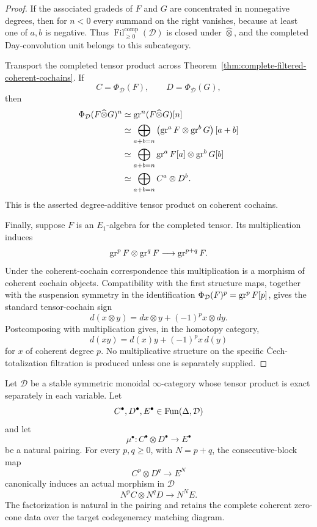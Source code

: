 \begin{proof}
If the associated gradeds of \(F\) and \(G\) are concentrated in
nonnegative degrees, then for \(n<0\) every summand on the right vanishes,
because at least one of \(a,b\) is negative.  Thus
\(\operatorname{Fil}^{\mathrm{comp}}_{\geq0}(\mathcal D)\) is closed under
\(\widehat\otimes\), and the completed Day-convolution unit belongs to this
subcategory.

Transport the completed tensor product across
Theorem~\ref{thm:complete-filtered-coherent-cochains}.  If
\[
    C=\Phi_{\mathcal D}(F),
    \qquad
    D=\Phi_{\mathcal D}(G),
\]
then
\[
\begin{aligned}
    \Phi_{\mathcal D}(F\widehat\otimes G)^n
    &\simeq
    \operatorname{gr}^n(F\widehat\otimes G)[n]
    \\
    &\simeq
    \bigoplus_{a+b=n}
    \left(
        \operatorname{gr}^aF\otimes\operatorname{gr}^bG
    \right)[a+b]
    \\
    &\simeq
    \bigoplus_{a+b=n}
    \operatorname{gr}^aF[a]\otimes\operatorname{gr}^bG[b]
    \\
    &\simeq
    \bigoplus_{a+b=n}
    C^a\otimes D^b.
\end{aligned}
\]
This is the asserted degree-additive tensor product on coherent cochains.

Finally, suppose \(F\) is an \(E_1\)-algebra for the completed tensor.  Its
multiplication induces
\[
    \operatorname{gr}^pF\otimes\operatorname{gr}^qF
    \longrightarrow
    \operatorname{gr}^{p+q}F.
\]
Under the coherent-cochain correspondence this multiplication is a morphism
of coherent cochain objects.  Compatibility with the first structure maps,
together with the suspension symmetry in the identification
\(\Phi_{\mathcal D}(F)^p=\operatorname{gr}^pF[p]\), gives the standard tensor-cochain sign
\[
    d(x\otimes y)
    =
    dx\otimes y
    +
    (-1)^p x\otimes dy.
\]
Postcomposing with multiplication gives, in the homotopy category,
\[
    d(xy)
    =
    d(x)y+(-1)^p x\,d(y)
\]
for \(x\) of coherent degree \(p\).  No multiplicative structure on the
specific \v{C}ech-totalization filtration is produced unless one is separately
supplied.
\end{proof}

\begin{lemma}
\label{lem:aw-consecutive-block-matching-cube}
Let \(\mathcal D\) be a stable symmetric monoidal \(\infty\)-category whose
tensor product is exact separately in each variable.  Let
\[
    C^\bullet,D^\bullet,E^\bullet\in\operatorname{Fun}(\Delta,\mathcal D)
\]
and let
\[
    \mu^\bullet:
    C^\bullet\otimes D^\bullet
    \longrightarrow
    E^\bullet
\]
be a natural pairing.  For every \(p,q\geq0\), with \(N=p+q\), the
consecutive-block map
\[
    C^p\otimes D^q
    \longrightarrow
    E^N
\]
canonically induces an actual morphism in \(\mathcal D\)
\[
\boxed{
    N^pC\otimes N^qD
    \longrightarrow
    N^NE.
}
\]
The factorization is natural in the pairing and retains the complete coherent
zero-cone data over the target codegeneracy matching diagram.
\end{lemma}

